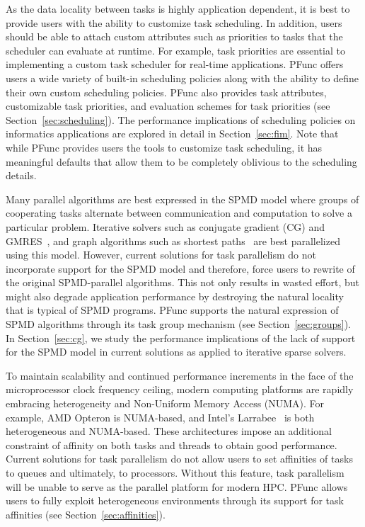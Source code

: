 \documentclass{sig-alternate}
\begin{document}
As the data locality between tasks is highly application dependent, it is best
to provide users with the ability to customize task scheduling. 
%
In addition, users should be able to attach custom attributes such as
priorities to tasks that the scheduler can evaluate at runtime.  For example,
task priorities are essential to implementing a custom task scheduler for
real-time applications. PFunc offers users a wide variety of built-in scheduling
policies along with the ability to define their own custom scheduling policies. 
%
PFunc also provides task attributes, customizable task priorities, and
evaluation schemes for task priorities (see Section~\ref{sec:scheduling}).  The
performance implications of scheduling policies on informatics applications are
explored in detail in Section~\ref{sec:fim}.  Note that while PFunc
provides users the tools to customize task scheduling, it has
meaningful defaults that allow them to be completely
oblivious to the scheduling details.

Many parallel algorithms are best expressed in the SPMD model where groups of
cooperating tasks alternate between communication and computation to solve a
particular problem.  Iterative solvers such as conjugate gradient (CG) and
GMRES~\cite{saadBook}, and graph algorithms such as shortest
paths~\cite{Meyer03:DeltaStepping} are best parallelized using this model.
However, current solutions for task parallelism do not incorporate support for
the SPMD model and therefore, force users to rewrite of the original SPMD-parallel
algorithms.  This not only results in wasted effort, but might also degrade
application performance by destroying the natural locality that is typical of
SPMD programs.  PFunc supports the natural expression of SPMD algorithms
through its task group mechanism (see Section~\ref{sec:groups}).  In
Section~\ref{sec:cg}, we study the performance implications of the lack of
support for the SPMD model in current solutions as applied
to iterative sparse solvers.

To maintain scalability and continued performance increments in the face of the
microprocessor clock frequency ceiling, modern computing platforms are rapidly
embracing heterogeneity and Non-Uniform Memory Access (NUMA).  For example, AMD
Opteron is NUMA-based, and Intel's Larrabee~\cite{seiler2008} is both
heterogeneous and NUMA-based. These architectures impose an additional
constraint of affinity on both tasks and threads to obtain good performance.
Current solutions for task parallelism do not allow users to set affinities of
tasks to queues and ultimately, to processors. 
%
Without this feature, task parallelism will be unable to serve as the parallel
platform for modern HPC. PFunc allows users to fully
exploit heterogeneous environments through its support for task
affinities (see Section~\ref{sec:affinities}).
\end{document}
